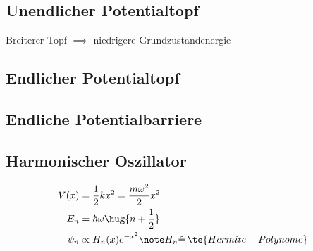 \documentclass[twocolumn, unnumberedsubsub]{summery_3.1}
\begin{document}
\subsection{Unendlicher Potentialtopf}
Breiterer Topf \(\implies\) niedrigere Grundzustandenergie

\subsection{Endlicher Potentialtopf}
\subsection{Endliche Potentialbarriere}
\subsection{Harmonischer Oszillator}
\begin{align*}
    V(x) &= \frac12k x^2 = \frac{m\omega^2}{2}x^2\\
    E_n &= \hbar \omega\hug{n+\frac12}\\
    \psi_n &\propto H_n(x) e^{-x^2}\note H_n \hat =\, \te{Hermite-Polynome}
\end{align*}
\end{document}
